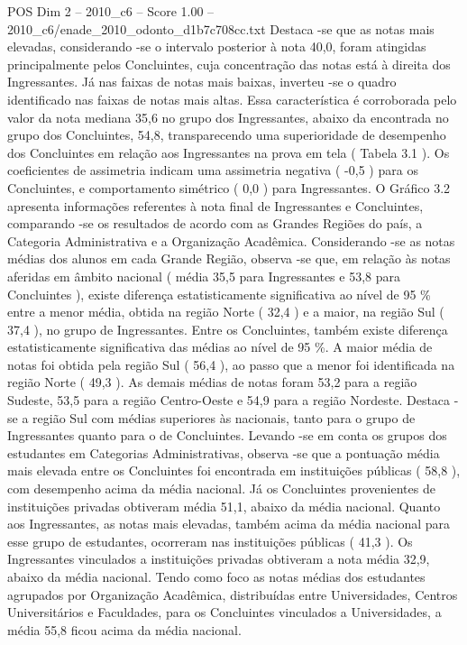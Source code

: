 \begin{textsample}{POS Dim 2 – 2010\_c6 – Score 1.00 – 2010\_c6/enade\_2010\_odonto\_d1b7c708cc.txt}
Destaca -se que as notas mais elevadas, considerando -se o intervalo posterior à nota 40,0, foram atingidas principalmente pelos Concluintes, cuja concentração das notas está à direita dos Ingressantes.
Já nas faixas de notas mais baixas, inverteu -se o quadro identificado nas faixas de notas mais altas.
Essa característica é corroborada pelo valor da nota mediana 35,6 no grupo dos Ingressantes, abaixo da encontrada no grupo dos Concluintes, 54,8, transparecendo uma superioridade de desempenho dos Concluintes em relação aos Ingressantes na prova em tela ( Tabela 3.1 ).
Os coeficientes de assimetria indicam uma assimetria negativa ( -0,5 ) para os Concluintes, e comportamento simétrico ( 0,0 ) para Ingressantes.
O Gráfico 3.2 apresenta informações referentes à nota final de Ingressantes e Concluintes, comparando -se os resultados de acordo com as Grandes Regiões do país, a Categoria Administrativa e a Organização Acadêmica.
Considerando -se as notas médias dos alunos em cada Grande Região, observa -se que, em relação às notas aferidas em âmbito nacional ( média 35,5 para Ingressantes e 53,8 para Concluintes ), existe diferença estatisticamente significativa ao nível de 95 \% entre a menor média, obtida na região Norte ( 32,4 ) e a maior, na região Sul ( 37,4 ), no grupo de Ingressantes.
Entre os Concluintes, também existe diferença estatisticamente significativa das médias ao nível de 95 \%.
A maior média de notas foi obtida pela região Sul ( 56,4 ), ao passo que a menor foi identificada na região Norte ( 49,3 ).
As demais médias de notas foram 53,2 para a região Sudeste, 53,5 para a região Centro-Oeste e 54,9 para a região Nordeste.
Destaca -se a região Sul com médias superiores às nacionais, tanto para o grupo de Ingressantes quanto para o de Concluintes.
Levando -se em conta os grupos dos estudantes em Categorias Administrativas, observa -se que a pontuação média mais elevada entre os Concluintes foi encontrada em instituições públicas ( 58,8 ), com desempenho acima da média nacional.
Já os Concluintes provenientes de instituições privadas obtiveram média 51,1, abaixo da média nacional.
Quanto aos Ingressantes, as notas mais elevadas, também acima da média nacional para esse grupo de estudantes, ocorreram nas instituições públicas ( 41,3 ).
Os Ingressantes vinculados a instituições privadas obtiveram a nota média 32,9, abaixo da média nacional.
Tendo como foco as notas médias dos estudantes agrupados por Organização Acadêmica, distribuídas entre Universidades, Centros Universitários e Faculdades, para os Concluintes vinculados a Universidades, a média 55,8 ficou acima da média nacional.

\end{textsample}
